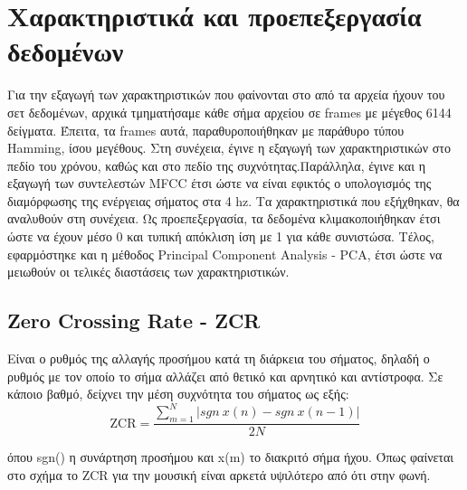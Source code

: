 \section{Χαρακτηριστικά και προεπεξεργασία δεδομένων}

Για την εξαγωγή των χαρακτηριστικών που φαίνονται στο από τα αρχεία ήχουν του σετ δεδομένων, αρχικά τμηματήσαμε κάθε σήμα αρχείου σε frames με μέγεθος 6144 δείγματα. Έπειτα, τα frames αυτά, παραθυροποιήθηκαν με παράθυρο τύπου Hamming, ίσου μεγέθους. Στη συνέχεια, έγινε η εξαγωγή των χαρακτηριστικών στο πεδίο του χρόνου, καθώς και στο πεδίο της συχνότητας.Παράλληλα, έγινε και η εξαγωγή των συντελεστών MFCC έτσι ώστε να είναι εφικτός ο υπολογισμός της διαμόρφωσης της ενέργειας σήματος στα 4 hz. Τα χαρακτηριστικά που εξήχθηκαν, θα αναλυθούν στη συνέχεια. Ως προεπεξεργασία, τα δεδομένα κλιμακοποιήθηκαν έτσι ώστε να έχουν μέσο 0 και τυπική απόκλιση ίση με 1 για κάθε συνιστώσα. Τέλος, εφαρμόστηκε και η μέθοδος Principal Component Analysis - PCA, έτσι ώστε να μειωθούν οι τελικές διαστάσεις των χαρακτηριστικών.


\subsection{Zero Crossing Rate - ZCR}

Είναι ο ρυθμός της αλλαγής προσήμου κατά τη διάρκεια του σήματος, δηλαδή ο ρυθμός με τον οποίο το σήμα αλλάζει από θετικό και αρνητικό και αντίστροφα. Σε κάποιο βαθμό, δείχνει την μέση συχνότητα του σήματος ως εξής:
\begin{equation}
\text{ZCR} = \frac{\sum_{m=1}^{N} |sgn ~x(n) - sgn~x(n-1)| }{2N}
\end{equation}

όπου sgn() η συνάρτηση προσήμου και x(m) το διακριτό σήμα ήχου. Όπως φαίνεται στο σχήμα %
 το ZCR για την μουσική είναι αρκετά υψιλότερο από ότι στην φωνή.



